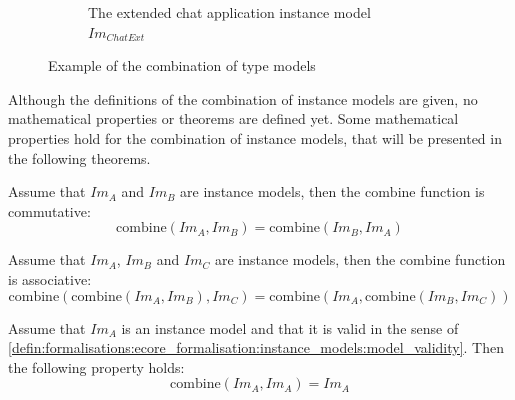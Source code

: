 \begin{figure}
\begin{subfigure}{\textwidth}
        \caption{The extended chat application instance model $Im_{ChatExt}$}
        \label{fig:transformation_framework:instance_models_and_instance_graphs:combining_instance_models:combine_example_imod12}
    \end{subfigure}
    \caption{Example of the combination of type models}
    \label{fig:transformation_framework:instance_models_and_instance_graphs:combining_instance_models:combine_example}
\end{figure}

Although the definitions of the combination of instance models are given, no mathematical properties or theorems are defined yet. Some mathematical properties hold for the combination of instance models, that will be presented in the following theorems.

\begin{thm}
\label{defin:transformation_framework:instance_models_and_instance_graphs:combining_instance_models:imod_combine_commute}
Assume that $Im_A$ and $Im_B$ are instance models, then the $\mathrm{combine}$ function is commutative:
\begin{equation*}
    \mathrm{combine}(Im_A, Im_B) = \mathrm{combine}(Im_B, Im_A)
\end{equation*}
\end{thm}

\begin{thm}
\label{defin:transformation_framework:instance_models_and_instance_graphs:combining_instance_models:imod_combine_assoc}
Assume that $Im_A$, $Im_B$ and $Im_C$ are instance models, then the $\mathrm{combine}$ function is associative:
\begin{equation*}
    \mathrm{combine}(\mathrm{combine}(Im_A, Im_B), Im_C) = \mathrm{combine}(Im_A, \mathrm{combine}(Im_B, Im_C))
\end{equation*}
\end{thm}

\begin{thm}
\label{defin:transformation_framework:instance_models_and_instance_graphs:combining_instance_models:imod_combine_idemp}
Assume that $Im_A$ is an instance model and that it is valid in the sense of \cref{defin:formalisations:ecore_formalisation:instance_models:model_validity}. Then the following property holds:
\begin{equation*}
    \mathrm{combine}(Im_A, Im_A) = Im_A
\end{equation*}
\end{thm}

